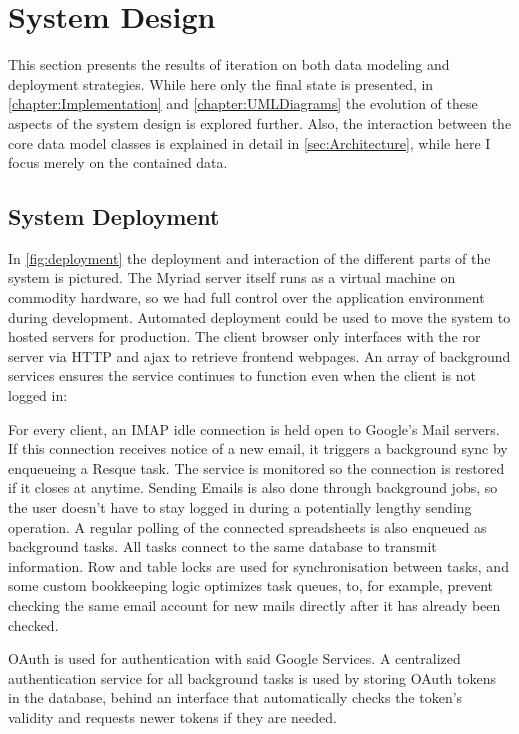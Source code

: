 \section{System Design}

This section presents the results of iteration on both data modeling and deployment strategies. While here only the final state is presented, in \autoref{chapter:Implementation} and \autoref{chapter:UMLDiagrams} the evolution of these aspects of the system design is explored further. Also, the interaction between the core data model classes is explained in detail in \autoref{sec:Architecture}, while here I focus merely on the contained data.


\subsection{System Deployment}

In \autoref{fig:deployment} the deployment and interaction of the different parts of the system is pictured. The Myriad server itself runs as a virtual machine on commodity hardware, so we had full control over the application environment during development. Automated deployment could be used to move the system to hosted servers for production. The client browser only interfaces with the \acrlong{ror} server via HTTP and \gls{ajax} to retrieve frontend webpages. An array of background services ensures the service continues to function even when the client is not logged in:

For every client, an IMAP idle connection is held open to Google's Mail servers. If this connection receives notice of a new email, it triggers a background sync by enqueueing a Resque task. The service is monitored so the connection is restored if it closes at anytime.
Sending Emails is also done through background jobs, so the user doesn't have to stay logged in during a potentially lengthy sending operation. A regular polling of the connected spreadsheets is also enqueued as background tasks. All tasks connect to the same database to transmit information. Row and table locks are used for synchronisation between tasks, and some custom bookkeeping logic optimizes task queues, to, for example, prevent checking the same email account for new mails directly after it has already been checked.

OAuth is used for authentication with said Google Services. A centralized authentication service for all background tasks is used by storing OAuth tokens in the database, behind an interface that automatically checks the token's validity and requests newer tokens if they are needed.



